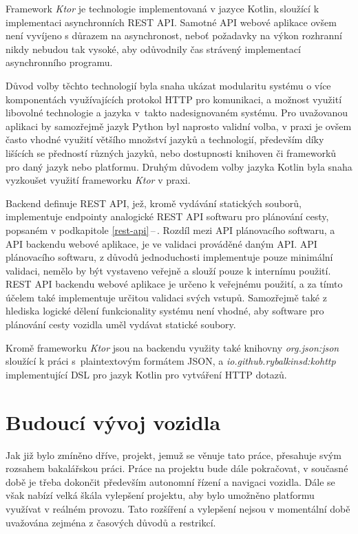 \documentclass[czech, bachelor]{diploma}
\newcommand{\filipref}[1]{\ref{#1}\,--\,\nameref{#1}}
\begin{document}
Framework \emph{Ktor} je technologie implementovaná v jazyce Kotlin, sloužící k implementaci asynchronních REST API. Samotné API
webové aplikace ovšem není vyvíjeno s důrazem na asynchronost, neboť požadavky na výkon rozhranní nikdy nebudou tak vysoké, aby
odůvodnily čas strávený implementací asynchronního programu.

Důvod volby těchto technologií byla snaha ukázat modularitu systému o více komponentách využívajících protokol HTTP
pro komunikaci, a možnost využití libovolné technologie a jazyka v~takto nadesignovaném systému. Pro uvažovanou aplikaci by
samozřejmě jazyk Python byl naprosto validní volba, v praxi je ovšem často vhodné využití většího množství jazyků a technologií,
především díky lišících se předností různých jazyků, nebo dostupnosti knihoven či frameworků pro daný jazyk nebo platformu. Druhým
důvodem volby jazyka Kotlin byla snaha vyzkoušet využití frameworku \emph{Ktor} v praxi.

Backend definuje REST API, jež, kromě vydávání statických souborů, implementuje endpointy analogické REST API softwaru
pro plánování cesty, popsaném v podkapitole \filipref{rest-api}. Rozdíl mezi API plánovacího softwaru, a API backendu webové
aplikace, je ve validaci prováděné daným API. API plánovacího softwaru, z důvodů jednoduchosti implementuje pouze minimální
validaci, nemělo by být vystaveno veřejně a slouží pouze k internímu použití. REST API backendu webové aplikace je určeno
k veřejnému použití, a za tímto účelem také implementuje určitou validaci svých vstupů. Samozřejmě také z hlediska logické dělení
funkcionality systému není vhodné, aby software pro plánování cesty vozidla uměl vydávat statické soubory.

Kromě frameworku \emph{Ktor} jsou na backendu využity také knihovny \emph{org.json:json} sloužící k práci s~plaintextovým formátem
JSON, a \emph{io.github.rybalkinsd:kohttp} implementující DSL pro jazyk Kotlin pro vytváření HTTP dotazů.

\chapter{Budoucí vývoj vozidla}

Jak již bylo zmíněno dříve, projekt, jemuž se věnuje tato práce, přesahuje svým rozsahem bakalářskou práci. Práce na projektu bude
dále pokračovat, v současné době je třeba dokončit především autonomní řízení a navigaci vozidla. Dále se však nabízí velká škála
vylepšení projektu, aby bylo umožněno platformu využívat v reálném provozu. Tato rozšíření a vylepšení nejsou v momentální době
uvažována zejména z časových důvodů a restrikcí.
\end{document}
